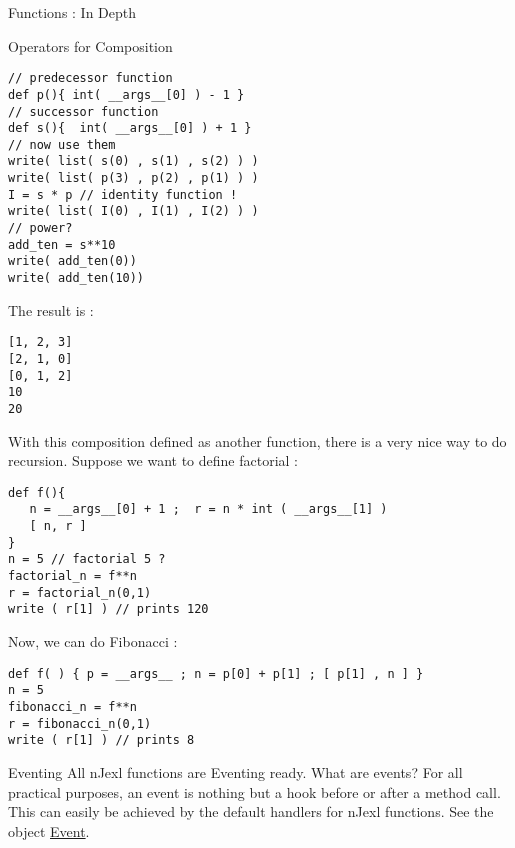 \begin{section}{Functions : In Depth}
\begin{subsection}{Operators for Composition}
\begin{center}\begin{minipage}{\linewidth}
\begin{lstlisting}[style=JexlStyle]
// predecessor function 
def p(){ int( __args__[0] ) - 1 }
// successor function 
def s(){  int( __args__[0] ) + 1 }
// now use them 
write( list( s(0) , s(1) , s(2) ) )
write( list( p(3) , p(2) , p(1) ) )
I = s * p // identity function !
write( list( I(0) , I(1) , I(2) ) )
// power?
add_ten = s**10 
write( add_ten(0))
write( add_ten(10))
\end{lstlisting}
\end{minipage}\end{center}

The result is :
\begin{lstlisting}[style=all]
[1, 2, 3]
[2, 1, 0]
[0, 1, 2]
10
20
\end{lstlisting}

With this composition defined as another function, 
there is a very nice way to do recursion.
Suppose we want to define factorial :

\begin{lstlisting}[style=JexlStyle]
def f(){ 
   n = __args__[0] + 1 ;  r = n * int ( __args__[1] )  
   [ n, r ] 
}
n = 5 // factorial 5 ?
factorial_n = f**n 
r = factorial_n(0,1)
write ( r[1] ) // prints 120
\end{lstlisting}

Now, we can do Fibonacci :
\begin{lstlisting}[style=JexlStyle]
def f( ) { p = __args__ ; n = p[0] + p[1] ; [ p[1] , n ] }
n = 5 
fibonacci_n = f**n 
r = fibonacci_n(0,1)
write ( r[1] ) // prints 8 
\end{lstlisting}
\end{subsection}

\begin{subsection}{Eventing}
All nJexl functions are Eventing ready.
What are events? For all practical purposes, 
an event is nothing but a hook before or after a method call.
This can easily be achieved by the default handlers for nJexl functions.
See the object  
\href{https://github.com/nmondal/njexl/blob/master/lang/src/main/java/com/noga/njexl/lang/extension/oop/ScriptClassBehaviour.java}{Event}.


\end{subsection}
\end{section}
